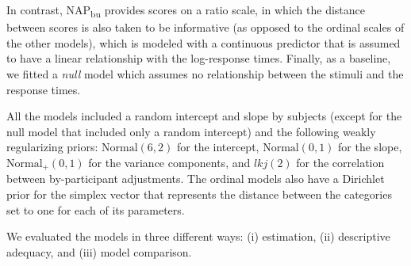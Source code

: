 In contrast, NAP\textsubscript{bu} provides scores on a ratio scale, in which the distance between scores is also taken to be informative (as opposed to the ordinal scales of the other models), which is modeled with a continuous predictor that is assumed to have a linear relationship with the log-response times. Finally, as a baseline, we fitted a \textit{null} model which assumes no relationship between the stimuli and the response times.

All the models included a random intercept and slope by subjects (except for the null model that included only a random intercept) and the following weakly regularizing priors: \(\text{Normal}(6, 2)\) for the intercept, \(\text{Normal}(0, 1)\) for the slope, \(\text{Normal}_+(0,1)\) for the variance components, and \(lkj(2)\) for the correlation between by-participant adjustments. The ordinal models also have a Dirichlet prior for the simplex vector that represents the distance between the categories set to one for each of its parameters.

We evaluated the models in three different ways: (i) estimation, (ii) descriptive adequacy, and (iii) model comparison.\\

